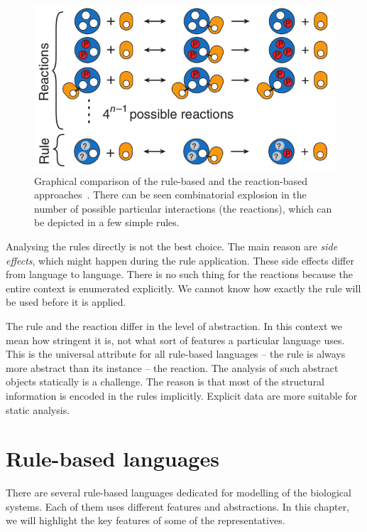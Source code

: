 \documentclass[12pt, twoside]{fithesis2} %
\begin{document}
\begin{figure}[!h]
\begin{center}
\includegraphics[scale=0.5]{pics/reaction_vs_rule}
\end{center}
\caption{Graphical comparison of the rule-based and the reaction-based approaches~\cite{sneddon2011efficient}. There can be seen combinatorial explosion in the number of possible particular interactions (the reactions), which can be depicted in a few simple rules.}\label{reaction_vs_rule}
\end{figure}
\vspace*{-0.1cm}

Analysing the rules directly is not the best choice. The main reason are \emph{side effects}, which might happen during the rule application. These side effects differ from language to language. There is no such thing for the reactions because the entire context is enumerated explicitly. We cannot know how exactly the rule will be used before it is applied.

The rule and the reaction differ in the level of abstraction. In this context we mean how stringent it is, not what sort of features a particular language uses. This is the universal attribute for all rule-based languages -- the rule is always more abstract than its instance -- the reaction. The analysis of such abstract objects statically is a challenge. The reason is that most of the structural information is encoded in the rules implicitly. Explicit data are more suitable for static analysis.

\section{Rule-based languages}
\label{rule_based_languages}

There are several rule-based languages dedicated for modelling of the biological systems. Each of them uses different features and abstractions. In this chapter, we will highlight the key features of some of the representatives.
\end{document}
